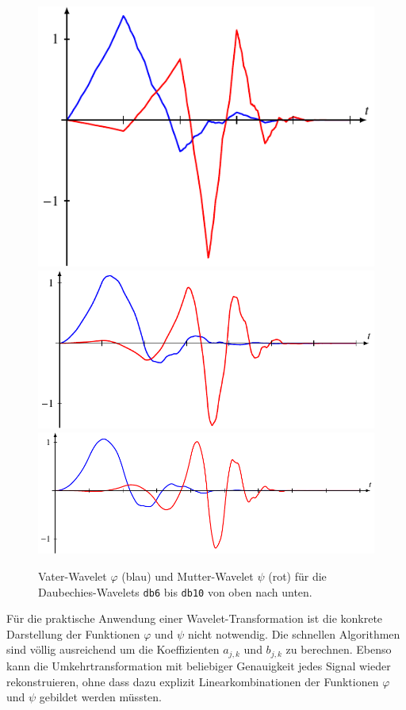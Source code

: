 \begin{figure}
\includegraphics{chapters/7-algo/images/db3.pdf}\\
\includegraphics{chapters/7-algo/images/db4.pdf}\\
\includegraphics{chapters/7-algo/images/db5.pdf}
\caption{Vater-Wavelet $\varphi$ (blau) und Mutter-Wavelet $\psi$
(rot) für die Daubechies-Wavelets \texttt{db6} bis \texttt{db10}
von oben nach unten.
\label{buch:algo:db2}}
\end{figure}%
Für die praktische Anwendung einer Wavelet-Transformation ist
die konkrete Darstellung der Funktionen $\varphi$ und $\psi$
nicht notwendig.
Die schnellen Algorithmen sind völlig ausreichend um die
Koeffizienten $a_{j,k}$ und $b_{j,k}$ zu berechnen.
Ebenso kann die Umkehrtransformation mit beliebiger Genauigkeit
jedes Signal wieder rekonstruieren, ohne dass dazu explizit 
Linearkombinationen der Funktionen $\varphi$ und $\psi$ gebildet
werden müssten.

